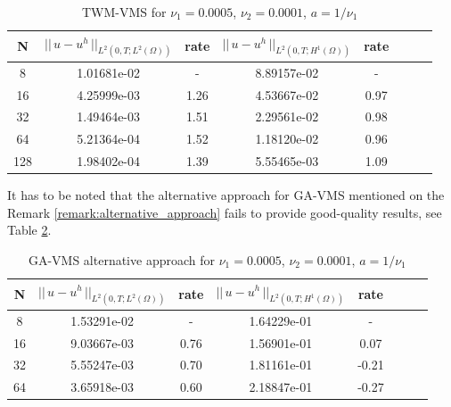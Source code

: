 \documentclass[10pt]{article}%
\numberwithin{equation}{section}
\begin{document}
\begin{table}[!ht]
	\caption{TWM-VMS for $\nu_1 = 0.0005$, $\nu_2 = 0.0001$, $a = 1/\nu_1$}
	\begin{center} \label{table:TWM-VMSsmall}
		\begin{tabular}{|c|c|c|c|c|c|c|c|}
			\hline N  & $||\,u-u^h\,||_{L^2(0,T;L^2(\Omega))}$ & rate & $||\,u-u^h\,||_{L^2(0,T;H^1(\Omega))}$ & rate\\
			\hline 8  & 1.01681e-02 & -    & 8.89157e-02 & -    \\
			\hline 16 & 4.25999e-03 & 1.26 & 4.53667e-02 & 0.97 \\
			\hline 32 & 1.49464e-03 & 1.51 & 2.29561e-02 & 0.98 \\
			\hline 64 & 5.21364e-04 & 1.52 & 1.18120e-02 & 0.96 \\
			\hline 128& 1.98402e-04 & 1.39 & 5.55465e-03 & 1.09 \\
			\hline
		\end{tabular}
	\end{center}
\end{table}
It has to be noted that the alternative approach for GA-VMS mentioned on the Remark \ref{remark:alternative_approach} fails to provide good-quality results, see Table \ref{table:GA-VMS_alt_small}.
\begin{table}[!ht]
	\caption{GA-VMS alternative approach for $\nu_1 = 0.0005$, $\nu_2 = 0.0001$, $a = 1/\nu_1$}
	\begin{center} \label{table:GA-VMS_alt_small}
		\begin{tabular}{|c|c|c|c|c|c|c|c|}
			\hline N  & $||\,u-u^h\,||_{L^2(0,T;L^2(\Omega))}$ & rate & $||\,u-u^h\,||_{L^2(0,T;H^1(\Omega))}$ & rate\\
			\hline 8  & 1.53291e-02 & -    & 1.64229e-01 & -    \\
			\hline 16 & 9.03667e-03 & 0.76 & 1.56901e-01 & 0.07 \\
			\hline 32 & 5.55247e-03 & 0.70 & 1.81161e-01 & -0.21 \\
			\hline 64 & 3.65918e-03 & 0.60 & 2.18847e-01 & -0.27 \\
			\hline
		\end{tabular}
	\end{center}
\end{table}
\end{document}
